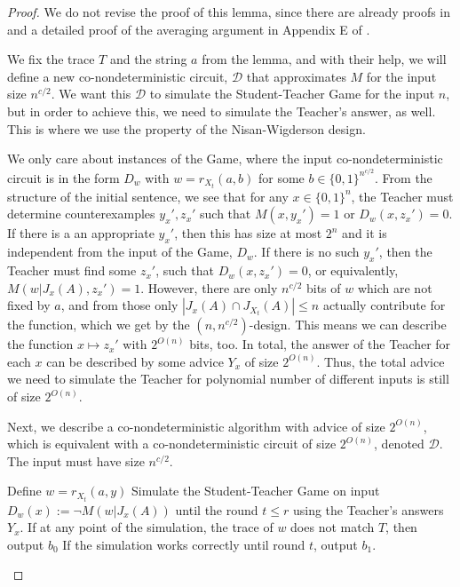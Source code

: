 \documentclass[11pt]{article}
\theoremstyle{definition}
\theoremstyle{definition}
\theoremstyle{remark}
\begin{document}
\begin{proof}
    We do not revise the proof of this lemma, since there are already proofs in \cite{DBLP:journals/jml/Krajicek11,PICH201529,pichS21} and a detailed proof of the averaging argument in Appendix E of \cite{lioliveira}.

    We fix the trace $T$ and the string $a$ from the lemma, and with their help, we will define a new co-nondeterministic circuit, $\mathcal{D}$ that approximates $M$ for the input size $n^{c/2}$. We want this $\mathcal{D}$ to simulate the Student-Teacher Game for the input $n$, but in order to achieve this, we need to simulate the Teacher's answer, as well. This is where we use the property of the Nisan-Wigderson design.

    We only care about instances of the Game, where the input co-nondeterministic circuit is in the form $D_w$ with $w=r_{X_t}(a,b)$ for some $b\in \{0,1\}^{n^{c/2}}$. From the structure of the initial sentence, we see that for any $x\in\{0,1\}^n$, the Teacher must determine counterexamples $y_x',z_x'$ such that $M(x,y_x')=1$ or $D_w(x,z_x')=0$. If there is a an appropriate $y_x'$, then this has size at most $2^n$ and it is independent from the input of the Game, $D_w$. If there is no such $y_x'$, then the Teacher must find some $z_x'$, such that $D_w(x,z_x')=0$, or equivalently, $M(w|J_x(A),z_x')=1$. However, there are only $n^{c/2}$ bits of $w$ which are not fixed by $a$, and from those only $|J_x(A)\cap J_{X_t}(A)|\leq n$ actually contribute for the function, which we get by the $(n,n^{c/2})$-design. This means we can describe the function $x\mapsto z_x'$ with $2^{O(n)}$ bits, too. In total, the answer of the Teacher for each $x$ can be described by some advice $Y_x$ of size $2^{O(n)}$. Thus, the total advice we need to simulate the Teacher for polynomial number of different inputs is still of size $2^{O(n)}$.

    Next, we describe a co-nondeterministic algorithm with advice of size $2^{O(n)}$, which is equivalent with a co-nondeterministic circuit of size $2^{O(n)}$, denoted $\mathcal{D}$. The input must have size $n^{c/2}$.

\begin{algorithm}[H]
     \caption{The pseudocode of the algorithm $\mathcal{D}$ that approximates $M$ on input sizes $n^{c/2}$.}
     \vspace{0.3em}
     Define $w=r_{X_t}(a,y)$\;
     Simulate the Student-Teacher Game on input $D_w(x):=\neg M(w|J_x(A))$ until the round $t\leq r$ using the Teacher's answers $Y_x$.\;
     If at any point of the simulation, the trace of $w$ does not match $T$, then output $b_0$\;
     If the simulation works correctly until round $t$, output $b_1$.
\end{algorithm}


\end{proof}
\end{document}
